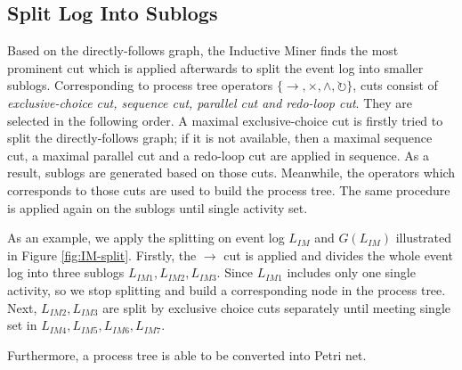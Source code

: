 \subsection{Split Log Into Sublogs}
Based on the directly-follows graph, the Inductive Miner finds the most prominent cut which is applied afterwards to split the event log into smaller sublogs. Corresponding to process tree operators $ \{\rightarrow, \times, \land, \circlearrowright \}$, cuts consist of \emph{exclusive-choice cut, sequence cut, parallel cut and redo-loop cut}. They are selected in the following order. A maximal exclusive-choice cut is firstly tried to split the directly-follows graph; if it is not available, then a maximal sequence cut, a  maximal parallel cut and a redo-loop cut are applied in sequence. As a result, sublogs are generated based on those cuts. Meanwhile, the operators which corresponds to those cuts are used to build the process tree. The same procedure is applied again on the sublogs until single activity set.  

As an example, we apply the splitting on event log $L_{IM}$ and $G(L_{IM})$ illustrated in Figure \ref{fig:IM-split}. Firstly, the $\rightarrow$ cut is applied and divides the whole event log into three sublogs $L_{IM1},L_{IM2},L_{IM3}$. Since $L_{IM1}$ includes only one single activity, so we stop splitting and build a corresponding node in the process tree. Next, $L_{IM2},L_{IM3}$ are split by exclusive choice cuts separately until meeting single set in $L_{IM4},L_{IM5},L_{IM6},L_{IM7}$.

Furthermore, a process tree is able to be converted into Petri net. 
